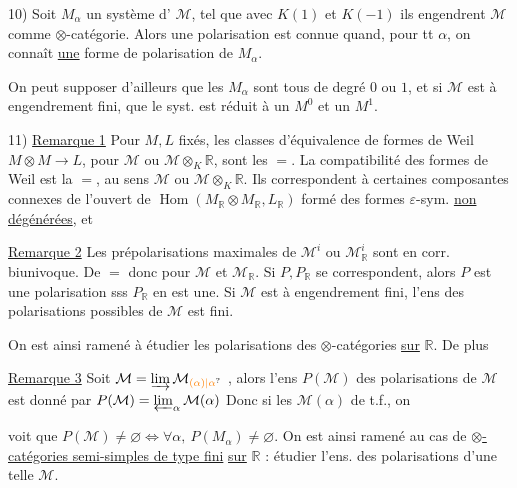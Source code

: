 
10) Soit $M_\alpha$ un système d'   $\mathcal M$, tel que avec $K(1)$ et $K(-1)$ ils engendrent $\mathcal M$ comme $\otimes$-catégorie. Alors une polarisation est connue quand, pour tt $\alpha$, on connaît \uline{une} forme de polarisation \inserted{$\varphi_\alpha$} de $M_\alpha$.

On peut supposer d'ailleurs que les $M_\alpha$ sont tous de degré $0$ ou $1$, et si $\mathcal M$ est à engendrement fini, que le syst. est réduit à un $M^0$ et un $M^1$. 

11) \uline{Remarque 1}  Pour $M,L$ fixés, les classes d'équivalence de formes de Weil  $M\otimes M\to L$,  pour $\mathcal M$ ou $\mathcal M\otimes_K\mathbb R$, sont les $=$. La compatibilité des formes de Weil est la $=$, au sens  $\mathcal M$ ou $\mathcal M\otimes_K\mathbb R$. Ils correspondent à certaines composantes connexes de l'ouvert de $\operatorname{Hom}(M_{\mathbb R}\otimes M_{\mathbb R},L_{\mathbb R})$ formé des formes $\varepsilon$-sym. \uline{non dégénérées}, et 

\uline{Remarque 2} Les prépolarisations maximales de $\mathcal M^i$ ou $\mathcal M_{\mathbb R}^i$ sont en corr. biunivoque. De $=$ donc pour $\mathcal M$ et $\mathcal M_{\mathbb R}$. Si $P,P_{\mathbb R}$ se correspondent, alors $P$ est une polarisation sss $P_{\mathbb R}$ en est une. Si $\mathcal M$ est à engendrement fini,  l'ens des polarisations possibles de $\mathcal M$ est fini.

On est ainsi ramené à étudier les polarisations des $\otimes$-catégories \uline{sur} $\mathbb R$. De plus

\uline{Remarque 3} Soit $\mathcal M=\varinjlim\mathcal M_{\unsure{(\alpha)|\alpha}}$ , alors l'ens $P(\mathcal M)$ des polarisations de $\mathcal M$ est donné par $P(\mathcal M)=\varprojlim_\alpha\mathcal M(\alpha)$  Donc si les $\mathcal M(\alpha)$  de t.f., on


voit que $P(\mathcal M)\ne\varnothing\Longleftrightarrow\forall\alpha,\ P(M_\alpha)\ne\varnothing$. On est ainsi ramené au cas de \uline{$\otimes$-catégories semi-simples de type fini} \uline{sur} $\mathbb R$ : étudier l'ens. des polarisations d'une telle $\mathcal M$.

